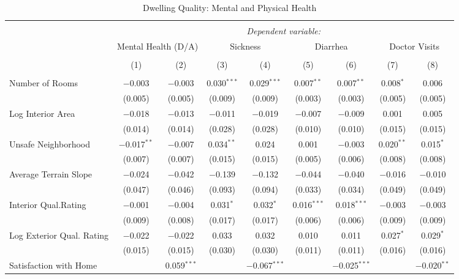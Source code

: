 
\begin{table}[H] \centering 
  \caption{Dwelling Quality: Mental and Physical Health} 
  \label{reg_TABLE6} 
\scriptsize 
\begin{tabular}{@{\extracolsep{-7pt}}lcccccccc} 
\\[-1.8ex]\hline 
\hline \\[-1.8ex] 
 & \multicolumn{8}{c}{\textit{Dependent variable:}} \\ 
\cline{2-9} 
 & \multicolumn{2}{c}{Mental Health (D/A)} & \multicolumn{2}{c}{Sickness} & \multicolumn{2}{c}{Diarrhea} & \multicolumn{2}{c}{Doctor Visits} \\ 
\\[-1.8ex] & (1) & (2) & (3) & (4) & (5) & (6) & (7) & (8)\\ 
\hline \\[-1.8ex] 
 Number of Rooms & $-$0.003 & $-$0.003 & 0.030$^{***}$ & 0.029$^{***}$ & 0.007$^{**}$ & 0.007$^{**}$ & 0.008$^{*}$ & 0.006 \\ 
  & (0.005) & (0.005) & (0.009) & (0.009) & (0.003) & (0.003) & (0.005) & (0.005) \\ 
  Log Interior Area & $-$0.018 & $-$0.013 & $-$0.011 & $-$0.019 & $-$0.007 & $-$0.009 & 0.001 & 0.005 \\ 
  & (0.014) & (0.014) & (0.028) & (0.028) & (0.010) & (0.010) & (0.015) & (0.015) \\ 
  Unsafe Neighborhood & $-$0.017$^{**}$ & $-$0.007 & 0.034$^{**}$ & 0.024 & 0.001 & $-$0.003 & 0.020$^{**}$ & 0.015$^{*}$ \\ 
  & (0.007) & (0.007) & (0.015) & (0.015) & (0.005) & (0.006) & (0.008) & (0.008) \\ 
  Average Terrain Slope & $-$0.024 & $-$0.042 & $-$0.139 & $-$0.132 & $-$0.044 & $-$0.040 & $-$0.016 & $-$0.010 \\ 
  & (0.047) & (0.046) & (0.093) & (0.094) & (0.033) & (0.034) & (0.049) & (0.049) \\ 
  Interior Qual.Rating & $-$0.001 & $-$0.004 & 0.031$^{*}$ & 0.032$^{*}$ & 0.016$^{***}$ & 0.018$^{***}$ & $-$0.003 & $-$0.003 \\ 
  & (0.009) & (0.008) & (0.017) & (0.017) & (0.006) & (0.006) & (0.009) & (0.009) \\ 
  Log Exterior Qual. Rating & $-$0.022 & $-$0.022 & 0.033 & 0.032 & 0.010 & 0.011 & 0.027$^{*}$ & 0.029$^{*}$ \\ 
  & (0.015) & (0.015) & (0.030) & (0.030) & (0.011) & (0.011) & (0.016) & (0.016) \\ 
  Satisfaction with Home &  & 0.059$^{***}$ &  & $-$0.067$^{***}$ &  & $-$0.025$^{***}$ &  & $-$0.020$^{**}$ \\ 

\end{tabular}
\end{table}

